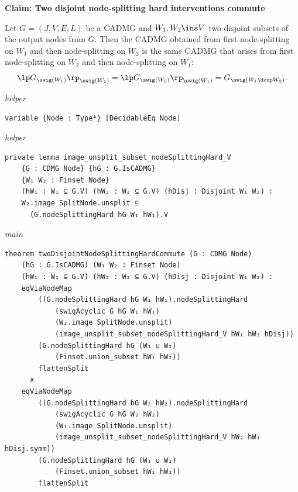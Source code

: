 \noindent\textbf{Claim: Two disjoint node-splitting hard interventions commute}\par\smallskip
{\appendixTexSize
   Let $G=(J,V,E,L)$ be a CADMG and $W_1, W_2 \ins V$ two disjoint subsets of the output nodes from $G$. 
   Then the CADMG obtained from first node-splitting on $W_1$ and then node-splitting on $W_2$ is the same CADMG that arises from first node-splitting on $W_2$ and then node-splitting on $W_1$:
   \[ \lp G_{\swig(W_1)} \rp_{\swig(W_2)} =  \lp G_{\swig(W_2)} \rp_{\swig(W_1)}  =  G_{\swig(W_1 \dcup W_2)}.   \]
\par}
\smallskip
{\small\textit{helper}}
\begin{verbatim}
variable {Node : Type*} [DecidableEq Node]
\end{verbatim}
{\small\textit{helper}}
\begin{verbatim}
private lemma image_unsplit_subset_nodeSplittingHard_V
    {G : CDMG Node} {hG : G.IsCADMG}
    {W₁ W₂ : Finset Node}
    (hW₁ : W₁ ⊆ G.V) (hW₂ : W₂ ⊆ G.V) (hDisj : Disjoint W₁ W₂) :
    W₂.image SplitNode.unsplit ⊆
      (G.nodeSplittingHard hG W₁ hW₁).V
\end{verbatim}
{\small\textit{main}}
\begin{verbatim}
theorem twoDisjointNodeSplittingHardCommute (G : CDMG Node)
    (hG : G.IsCADMG) (W₁ W₂ : Finset Node)
    (hW₁ : W₁ ⊆ G.V) (hW₂ : W₂ ⊆ G.V) (hDisj : Disjoint W₁ W₂) :
    eqViaNodeMap
        ((G.nodeSplittingHard hG W₁ hW₁).nodeSplittingHard
            (swigAcyclic G hG W₁ hW₁)
            (W₂.image SplitNode.unsplit)
            (image_unsplit_subset_nodeSplittingHard_V hW₁ hW₂ hDisj))
        (G.nodeSplittingHard hG (W₁ ∪ W₂)
            (Finset.union_subset hW₁ hW₂))
        flattenSplit
      ∧
    eqViaNodeMap
        ((G.nodeSplittingHard hG W₂ hW₂).nodeSplittingHard
            (swigAcyclic G hG W₂ hW₂)
            (W₁.image SplitNode.unsplit)
            (image_unsplit_subset_nodeSplittingHard_V hW₂ hW₁ hDisj.symm))
        (G.nodeSplittingHard hG (W₁ ∪ W₂)
            (Finset.union_subset hW₁ hW₂))
        flattenSplit
\end{verbatim}
~%

\vspace{\appendixNotesGap}

